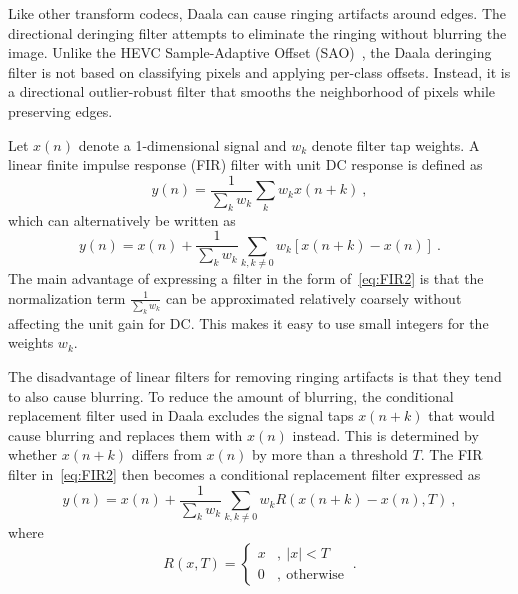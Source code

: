 \documentclass[english,conference,10pt]{IEEEtran}
\begin{document}
Like other transform codecs, Daala can cause ringing artifacts around edges.
The directional deringing filter attempts to eliminate the ringing without
blurring the image. Unlike the HEVC Sample-Adaptive Offset (SAO)~\cite{HEVC-SAO},
the Daala deringing filter is not based on classifying pixels and applying per-class
offsets. Instead, it is a directional outlier-robust filter that smooths the
neighborhood of pixels while preserving edges.

Let $x\left(n\right)$ denote a 1-dimensional signal and $w_{k}$
denote filter tap weights. A linear finite impulse response (FIR)
filter with unit DC response is defined as
\begin{equation}
y\left(n\right)=\frac{1}{\sum_{k}w_{k}}\sum_{k}w_{k}x\left(n+k\right)\ ,\label{eq:FIR1}
\end{equation}
which can alternatively be written as
\begin{equation}
y\left(n\right)=x\left(n\right)+\frac{1}{\sum_{k}w_{k}}\sum_{k,k\neq0}w_{k}\left[x\left(n+k\right)-x\left(n\right)\right]\ .\label{eq:FIR2}
\end{equation}
The main advantage of expressing a filter in the form of~\cref{eq:FIR2}
is that the normalization term $\frac{1}{\sum_{k}w_{k}}$ can be approximated
relatively coarsely without affecting the unit gain for DC\@. This makes
it easy to use small integers for the weights $w_{k}$.

The disadvantage of linear filters for removing ringing artifacts
is that they tend to also cause blurring. To reduce the amount of
blurring, the conditional replacement filter used in Daala excludes
the signal taps $x\left(n+k\right)$ that would cause blurring and
replaces them with $x\left(n\right)$ instead. This is determined
by whether $x\left(n+k\right)$ differs from $x\left(n\right)$ by
more than a threshold $T$. The FIR filter in~\cref{eq:FIR2}
then becomes a conditional replacement filter expressed as
\begin{equation}
y\left(n\right)=x\left(n\right)+\frac{1}{\sum_{k}w_{k}}\sum_{k,k\neq0}w_{k}R\left(x\left(n+k\right)-x\left(n\right),T\right)\ ,\label{eq:CRF}
\end{equation}
where
\begin{equation}
R\left(x,T\right)=\left\{ \begin{array}{ll}
x & ,\ \left|x\right|<T\\
0 & ,\ \mathrm{otherwise}
\end{array}\right.\ .
\end{equation}
\end{document}
